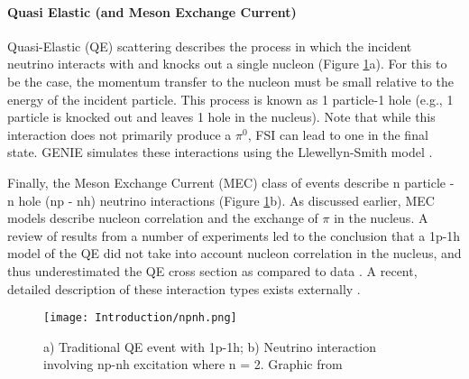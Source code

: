 \paragraph{ Quasi Elastic (and Meson Exchange Current) }
Quasi-Elastic (QE) scattering describes the process in which the incident neutrino interacts with and knocks out a single nucleon (Figure \ref{fig:npnh}a). For this to be the case, the momentum transfer to the nucleon must be small relative to the energy of the incident particle. This process is known as 1 particle-1 hole (e.g., 1 particle is knocked out and leaves 1 hole in the nucleus). Note that while this interaction does not primarily produce a $\pi^0$, FSI can lead to one in the final state. GENIE simulates these interactions using the Llewellyn-Smith model \cite{bib:llewellyn}.
\par Finally, the Meson Exchange Current (MEC) class of events describe n particle - n hole (np - nh) neutrino interactions (Figure \ref{fig:npnh}b). As discussed earlier, MEC models describe nucleon correlation and the exchange of $\pi$ in the nucleus. A review of results from a number of experiments led to the conclusion that a 1p-1h model of the QE did not take into account nucleon correlation in the nucleus, and thus underestimated the QE cross section as compared to data \cite{bib:martini_mec}. A recent, detailed description of these interaction types exists externally \cite{bib:katori_martini}. 

\begin{figure}[H]
\centering
\texttt{[image: Introduction/npnh.png]}
\caption{a) Traditional QE event with 1p-1h; b) Neutrino interaction involving np-nh excitation where n = 2. Graphic from \cite{bib:katori_martini} } 
\label{fig:npnh}
\end{figure}


